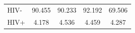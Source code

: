 \begin{tabular}{lcccc}
\hline
HIV- & 90.455 & 90.233 & 92.192 & 69.506 \\
HIV+ & 4.178 & 4.536 & 4.459 & 4.287 \\
\hline
\end{tabular}
